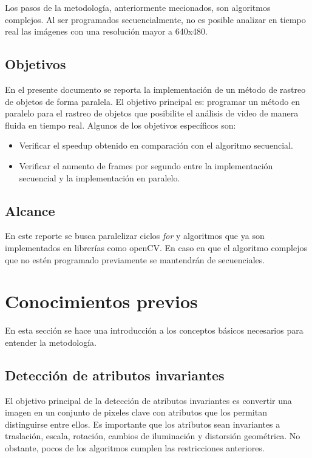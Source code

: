 \documentclass[a4paper]{article}
\begin{document}
Los pasos de la metodología, anteriormente mecionados, son algoritmos complejos. Al ser programados secuencialmente, no es posible analizar en tiempo real las imágenes con una resolución mayor a 640x480. 

\subsection{Objetivos}
En el presente documento se reporta la implementación de un método de rastreo de objetos de forma paralela. El objetivo principal es: programar un método en paralelo para el rastreo de objetos que posibilite el análisis de video de manera fluida en tiempo real. Algunos de los objetivos específicos son:

\begin{itemize}
	\item Verificar el speedup obtenido en comparación con el algoritmo secuencial.
    \item Verificar el aumento de frames por segundo entre la implementación secuencial y la implementación en paralelo.
\end{itemize}

\subsection{Alcance}
En este reporte se busca paralelizar ciclos \emph{for} y algoritmos que ya son implementados en librerías como openCV. En caso en que el algoritmo complejos que no estén programado previamente se mantendrán de secuenciales. 

\section{Conocimientos previos}
En esta sección se hace una introducción a los conceptos básicos necesarios para entender la metodología.

\subsection{Detección de atributos invariantes}
El objetivo principal de la detección de atributos invariantes es convertir una imagen en un conjunto de pixeles clave con atributos que los permitan distinguirse entre ellos. Es importante que los atributos sean invariantes a traslación, escala, rotación, cambios de iluminación y distorsión geométrica. No obstante, pocos de los algoritmos cumplen las restricciones anteriores. 
\end{document}
